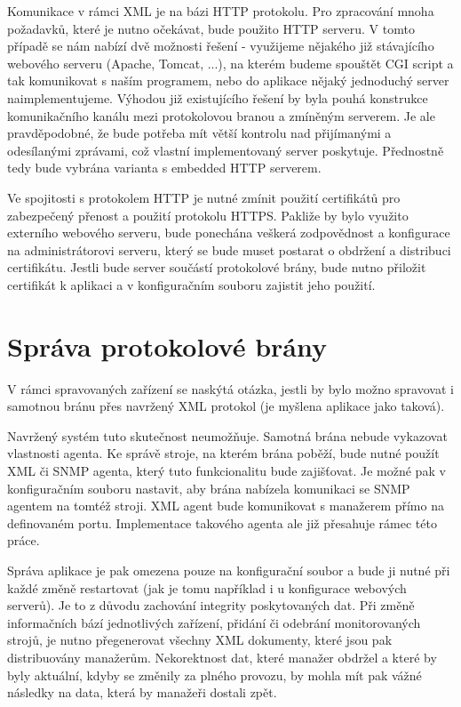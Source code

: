 Komunikace v rámci XML je na bázi HTTP protokolu. Pro zpracování mnoha požadavků, které je nutno očekávat, bude použito HTTP serveru. V tomto případě se nám nabízí dvě možnosti
řešení - využijeme nějakého již stávajícího webového serveru (Apache, Tomcat, ...), na kterém budeme spouštět CGI script a tak komunikovat s naším programem, nebo do aplikace nějaký jednoduchý server
naimplementujeme. Výhodou již existujícího řešení by byla pouhá konstrukce komunikačního kanálu mezi protokolovou branou a zmíněným serverem. Je ale pravděpodobné, že bude potřeba mít větší kontrolu
nad přijímanými a odesílanými zprávami, což vlastní implementovaný server poskytuje. Přednostně tedy bude vybrána varianta s embedded HTTP serverem.

Ve spojitosti s protokolem HTTP je nutné zmínit použití certifikátů pro zabezpečený přenost a použití protokolu HTTPS. Pakliže by bylo využito externího webového serveru, bude ponechána
veškerá zodpovědnost a konfigurace na administrátorovi serveru, který se bude muset postarat o obdržení a distribuci certifikátu. Jestli bude server součástí protokolové brány, bude
nutno přiložit certifikát k aplikaci a v konfiguračním souboru zajistit jeho použití.

\section{Správa protokolové brány}
V rámci spravovaných zařízení se naskýtá otázka, jestli by bylo možno spravovat i samotnou bránu přes navržený XML protokol (je myšlena aplikace jako taková). 

Navržený systém tuto skutečnost neumožňuje. Samotná brána nebude vykazovat vlastnosti agenta. Ke správě stroje, na kterém brána poběží, bude nutné použít XML či SNMP agenta, který tuto 
funkcionalitu bude zajišťovat. Je možné pak v konfiguračním souboru nastavit, aby brána nabízela komunikaci se SNMP agentem na tomtéž stroji. XML agent bude komunikovat s manažerem přímo na definovaném portu.
Implementace takového agenta ale již přesahuje rámec této práce.

Správa aplikace je pak omezena pouze na konfigurační soubor a bude ji nutné při každé změně restartovat (jak je tomu například i u konfigurace webových serverů). Je to z důvodu zachování integrity poskytovaných dat.
Při změně informačních bází jednotlivých zařízení, přidání či odebrání monitorovaných strojů, je nutno přegenerovat všechny XML dokumenty, které jsou pak distribuovány manažerům. Nekorektnost dat, které manažer obdržel a které
by byly aktuální, kdyby se změnily za plného provozu, by mohla mít pak vážné následky na data, která by manažeři dostali zpět.


